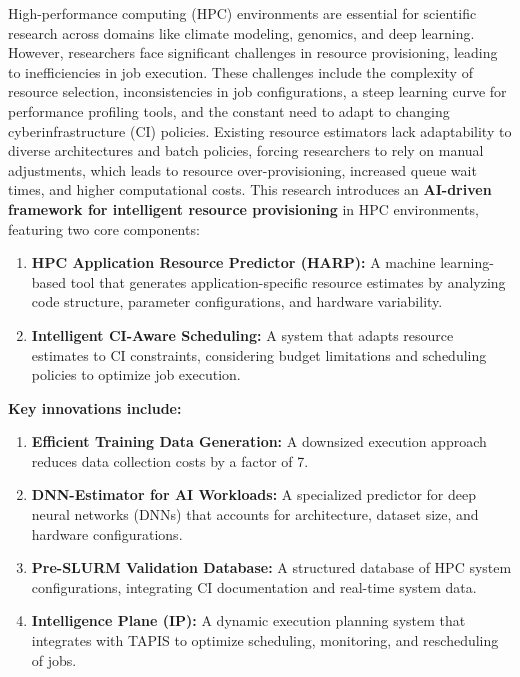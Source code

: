
High-performance computing (HPC) environments are essential for scientific research across domains like climate modeling, genomics, and deep learning. However, researchers face significant challenges in resource provisioning, leading to inefficiencies in job execution. These challenges include the complexity of resource selection, inconsistencies in job configurations, a steep learning curve for performance profiling tools, and the constant need to adapt to changing cyberinfrastructure (CI) policies. Existing resource estimators lack adaptability to diverse architectures and batch policies, forcing researchers to rely on manual adjustments, which leads to resource over-provisioning, increased queue wait times, and higher computational costs.
This research introduces an \textbf{AI-driven framework for intelligent resource provisioning} in HPC environments, featuring two core components:

\begin{enumerate}
    \item \textbf{HPC Application Resource Predictor (HARP):} A machine learning-based tool that generates application-specific resource estimates by analyzing code structure, parameter configurations, and hardware variability.
    \item \textbf{Intelligent CI-Aware Scheduling: }A system that adapts resource estimates to CI constraints, considering budget limitations and scheduling policies to optimize job execution.
\end{enumerate}

\textbf{Key innovations include:}
\begin{enumerate}
    \item \textbf{Efficient Training Data Generation:} A downsized execution approach reduces data collection costs by a factor of 7.
    \item \textbf{DNN-Estimator for AI Workloads:} A specialized predictor for deep neural networks (DNNs) that accounts for architecture, dataset size, and hardware configurations.
    \item \textbf{Pre-SLURM Validation Database:} A structured database of HPC system configurations, integrating CI documentation and real-time system data.
    \item \textbf{Intelligence Plane (IP):} A dynamic execution planning system that integrates with TAPIS to optimize scheduling, monitoring, and rescheduling of jobs.
\end{enumerate}


